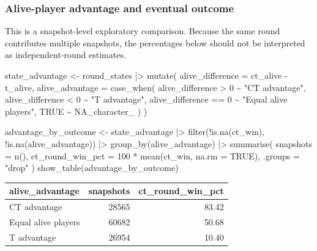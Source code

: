 \documentclass[
  letterpaper,
  DIV=11,
  numbers=noendperiod]{scrartcl}
\newenvironment{Shaded}{\begin{snugshade}}{\end{snugshade}}
\newcommand{\AttributeTok}[1]{\textcolor[rgb]{0.40,0.45,0.13}{#1}}
\newcommand{\ConstantTok}[1]{\textcolor[rgb]{0.56,0.35,0.01}{#1}}
\newcommand{\DecValTok}[1]{\textcolor[rgb]{0.68,0.00,0.00}{#1}}
\newcommand{\FunctionTok}[1]{\textcolor[rgb]{0.28,0.35,0.67}{#1}}
\newcommand{\NormalTok}[1]{\textcolor[rgb]{0.00,0.23,0.31}{#1}}
\newcommand{\OtherTok}[1]{\textcolor[rgb]{0.00,0.23,0.31}{#1}}
\newcommand{\SpecialCharTok}[1]{\textcolor[rgb]{0.37,0.37,0.37}{#1}}
\newcommand{\StringTok}[1]{\textcolor[rgb]{0.13,0.47,0.30}{#1}}
\newcounter{none} %
\begin{document}
\subsubsection{Alive-player advantage and eventual
outcome}\label{alive-player-advantage-and-eventual-outcome}

This is a snapshot-level exploratory comparison. Because the same round
contributes multiple snapshots, the percentages below should not be
interpreted as independent-round estimates.

\begin{Shaded}
\begin{Highlighting}[]
\NormalTok{state\_advantage }\OtherTok{\textless{}{-}}\NormalTok{ round\_states }\SpecialCharTok{|\textgreater{}}
  \FunctionTok{mutate}\NormalTok{(}
    \AttributeTok{alive\_difference =}\NormalTok{ ct\_alive }\SpecialCharTok{{-}}\NormalTok{ t\_alive,}
    \AttributeTok{alive\_advantage =} \FunctionTok{case\_when}\NormalTok{(}
\NormalTok{      alive\_difference }\SpecialCharTok{\textgreater{}} \DecValTok{0} \SpecialCharTok{\textasciitilde{}} \StringTok{"CT advantage"}\NormalTok{,}
\NormalTok{      alive\_difference }\SpecialCharTok{\textless{}} \DecValTok{0} \SpecialCharTok{\textasciitilde{}} \StringTok{"T advantage"}\NormalTok{,}
\NormalTok{      alive\_difference }\SpecialCharTok{==} \DecValTok{0} \SpecialCharTok{\textasciitilde{}} \StringTok{"Equal alive players"}\NormalTok{,}
      \ConstantTok{TRUE} \SpecialCharTok{\textasciitilde{}} \ConstantTok{NA\_character\_}
\NormalTok{    )}
\NormalTok{  )}

\NormalTok{advantage\_by\_outcome }\OtherTok{\textless{}{-}}\NormalTok{ state\_advantage }\SpecialCharTok{|\textgreater{}}
  \FunctionTok{filter}\NormalTok{(}\SpecialCharTok{!}\FunctionTok{is.na}\NormalTok{(ct\_win), }\SpecialCharTok{!}\FunctionTok{is.na}\NormalTok{(alive\_advantage)) }\SpecialCharTok{|\textgreater{}}
  \FunctionTok{group\_by}\NormalTok{(alive\_advantage) }\SpecialCharTok{|\textgreater{}}
  \FunctionTok{summarise}\NormalTok{(}
    \AttributeTok{snapshots =} \FunctionTok{n}\NormalTok{(),}
    \AttributeTok{ct\_round\_win\_pct =} \DecValTok{100} \SpecialCharTok{*} \FunctionTok{mean}\NormalTok{(ct\_win, }\AttributeTok{na.rm =} \ConstantTok{TRUE}\NormalTok{),}
    \AttributeTok{.groups =} \StringTok{"drop"}
\NormalTok{  )}
\FunctionTok{show\_table}\NormalTok{(advantage\_by\_outcome)}
\end{Highlighting}
\end{Shaded}

{\def\LTcaptype{none} %
\begin{longtable}[]{@{}lrr@{}}
\toprule\noalign{}
alive\_advantage & snapshots & ct\_round\_win\_pct \\
\midrule\noalign{}
\endhead
\bottomrule\noalign{}
\endlastfoot
CT advantage & 28565 & 83.42 \\
Equal alive players & 60682 & 50.68 \\
T advantage & 26954 & 10.40 \\
\end{longtable}
}
\end{document}
